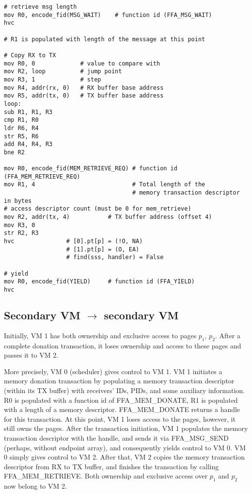 \documentclass{article}
\begin{document}
\begin{lstlisting}[caption={VM 1}]
# retrieve msg length
mov R0, encode_fid(MSG_WAIT)    # function id (FFA_MSG_WAIT)
hvc

# R1 is populated with length of the message at this point

# Copy RX to TX
mov R0, 0             # value to compare with
mov R2, loop          # jump point
mov R3, 1             # step
mov R4, addr(rx, 0)   # RX buffer base address
mov R5, addr(tx, 0)   # TX buffer base address
loop:
sub R1, R1, R3
cmp R1, R0
ldr R6, R4
str R5, R6
add R4, R4, R3
bne R2

mov R0, encode_fid(MEM_RETRIEVE_REQ) # function id (FFA_MEM_RETRIEVE_REQ)
mov R1, 4                            # Total length of the  
                                     # memory transaction descriptor in bytes
# access descriptor count (must be 0 for mem_retrieve)
mov R2, addr(tx, 4)           # TX buffer address (offset 4)
mov R3, 0
str R2, R3                                    
hvc               # [0].pt[p] = (!O, NA)
                  # [1].pt[p] = (O, EA)
                  # find(sss, handler) = False
                  
# yield
mov R0, encode_fid(YIELD)     # function id (FFA_YIELD)
hvc
\end{lstlisting}

\subsection{Secondary VM $\rightarrow$ secondary VM}
Initially, VM 1 has both ownership and exclusive access to pages $p_1$, $p_2$. After a complete donation transaction, it loses ownership and access to these pages and passes it to VM 2.

More precisely, VM 0 (scheduler) gives control to VM 1. VM 1 initiates a memory donation transaction by populating a memory transaction descriptor (within its TX buffer) with receivers' IDs, PIDs, and some auxiliary information. R0 is populated with a function id of FFA\_MEM\_DONATE, R1 is populated with a length of a memory descriptor. FFA\_MEM\_DONATE returns a handle for this transaction. At this point, VM 1 loses access to the pages, however, it still owns the pages. After the transaction initiation, VM 1 populates the memory transaction descriptor with the handle, and sends it via FFA\_MSG\_SEND (perhaps, without endpoint array), and consequently yields control to VM 0. VM 0 simply gives control to VM 2. After that, VM 2 copies the memory transaction descriptor from RX to TX buffer, and finishes the transaction by calling FFA\_MEM\_RETRIEVE. Both ownership and exclusive access over $p_1$ and $p_2$ now belong to VM 2.
\end{document}
